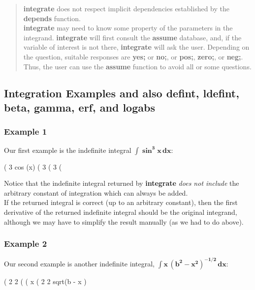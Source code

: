 \documentclass[12pt]{article}
\newcommand{\tcbr}{\textcolor{BrickRed}}
\begin{document}
\begin{quote}
\textbf{integrate} does not respect implicit dependencies established by the \textbf{depends} function. \\

\textbf{integrate} may need to know some property of the parameters in the integrand.
\textbf{integrate} will first consult the \textbf{assume} database, and, if the
   variable of interest is not there, \textbf{integrate} will ask the user.
Depending on the question, suitable responses are \textbf{yes;} or \textbf{no;},
  or \textbf{pos;}, \textbf{zero;}, or \textbf{neg;}.
Thus, the user can use the \textbf{assume} function to avoid all or some questions.  \\
\end{quote}
\normalsize
\newpage

\subsection{Integration Examples and also \textbf{defint}, \textbf{ldefint}, \textbf{beta},
                 \textbf{gamma}, \textbf{erf}, and \textbf{logabs}}  \label{symbolic}

\subsubsection*{Example 1}
Our first example is the \tcbr{indefinite} integral $\mathbf{\int \boldsymbol{\sin}^{3}x \, dx}$:
\begin{myVerbatim}
(%
                                  3
                               cos (x)
(%
                                  3
(%
                                       3
(%
\end{myVerbatim} 
Notice that the \tcbr{indefinite} integral returned by \textbf{integrate}
  \emph{does not include} the arbitrary
  constant of integration which can always be added.\\
  
\noindent If the returned integral is correct (up to an arbitrary constant), then the first
  derivative of the returned indefinite integral should be the original integrand,
  although we may have to simplify the result manually (as we had to do above).
\subsubsection*{Example 2}
Our second example is another indefinite integral,
    $\mathbf{\int x \, (b^{2}-x^{2})^{-1/2} \, dx}$:
\begin{myVerbatim}
(%
                                        2    2
(%
(%
                                       x
(%
                                       2    2
                                 sqrt(b  - x )
\end{myVerbatim}
\end{document}
